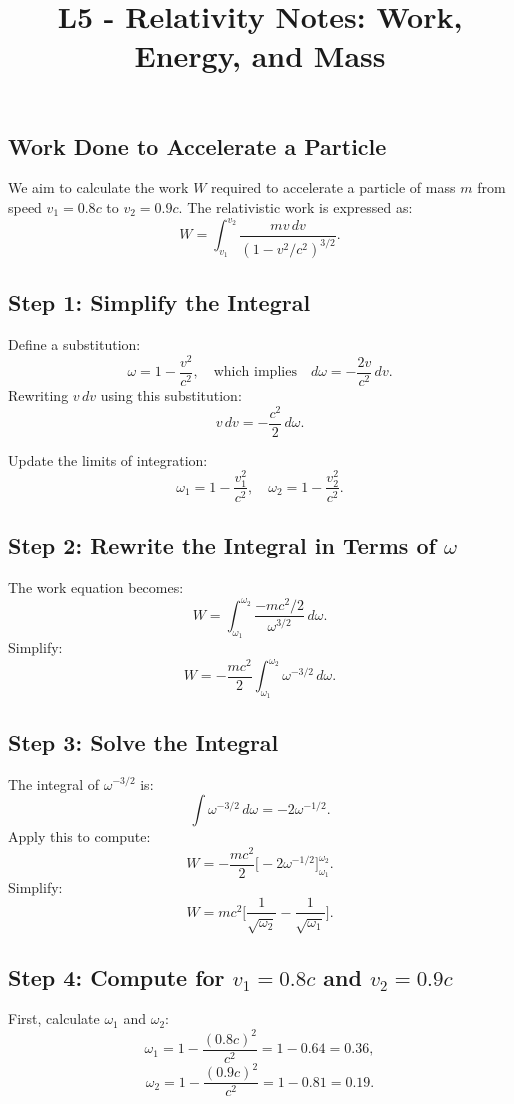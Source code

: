 \documentclass[a4paper,12pt]{article}
\begin{document}
\title{L5 - Relativity Notes: Work, Energy, and Mass}
\author{}
\date{}
\maketitle

\begin{multicols}{2}

\section{Work Done to Accelerate a Particle}
We aim to calculate the work \( W \) required to accelerate a particle of mass \( m \) from speed \( v_1 = 0.8c \) to \( v_2 = 0.9c \). The relativistic work is expressed as:
\[
W = \int_{v_1}^{v_2} \frac{mv \, dv}{(1 - v^2/c^2)^{3/2}}.
\]

\subsection*{Step 1: Simplify the Integral}
Define a substitution:
\[
\omega = 1 - \frac{v^2}{c^2}, \quad \text{which implies} \quad d\omega = -\frac{2v}{c^2} \, dv.
\]
Rewriting \( v \, dv \) using this substitution:
\[
v \, dv = -\frac{c^2}{2} \, d\omega.
\]

Update the limits of integration:
\[
\omega_1 = 1 - \frac{v_1^2}{c^2}, \quad \omega_2 = 1 - \frac{v_2^2}{c^2}.
\]

\subsection*{Step 2: Rewrite the Integral in Terms of \( \omega \)}
The work equation becomes:
\[
W = \int_{\omega_1}^{\omega_2} \frac{-mc^2/2}{\omega^{3/2}} \, d\omega.
\]
Simplify:
\[
W = -\frac{mc^2}{2} \int_{\omega_1}^{\omega_2} \omega^{-3/2} \, d\omega.
\]

\subsection*{Step 3: Solve the Integral}
The integral of \( \omega^{-3/2} \) is:
\[
\int \omega^{-3/2} \, d\omega = -2\omega^{-1/2}.
\]
Apply this to compute:
\[
W = -\frac{mc^2}{2} \Big[ -2\omega^{-1/2} \Big]_{\omega_1}^{\omega_2}.
\]
Simplify:
\[
W = mc^2 \Big[ \frac{1}{\sqrt{\omega_2}} - \frac{1}{\sqrt{\omega_1}} \Big].
\]

\subsection*{Step 4: Compute for \( v_1 = 0.8c \) and \( v_2 = 0.9c \)}
First, calculate \( \omega_1 \) and \( \omega_2 \):
\[
\omega_1 = 1 - \frac{(0.8c)^2}{c^2} = 1 - 0.64 = 0.36,
\]
\[
\omega_2 = 1 - \frac{(0.9c)^2}{c^2} = 1 - 0.81 = 0.19.
\]


\end{multicols}
\end{document}
